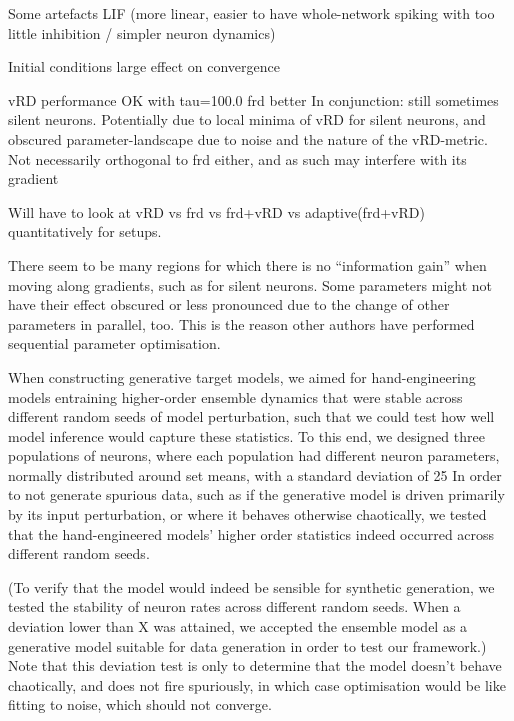 \documentclass[mphil,deptreport,ai]{infthesis} %
\begin{document}

Some artefacts LIF (more linear, easier to have whole-network spiking with too little inhibition / simpler neuron dynamics)

Initial conditions large effect on convergence

vRD performance OK with tau=100.0
frd better
In conjunction: still sometimes silent neurons. Potentially due to local minima of vRD for silent neurons, and obscured parameter-landscape due to noise and the nature of the vRD-metric. Not necessarily orthogonal to frd either, and as such may interfere with its gradient

Will have to look at vRD vs frd vs frd+vRD vs adaptive(frd+vRD) quantitatively for setups.

There seem to be many regions for which there is no “information gain” when moving along gradients, such as for silent neurons. Some parameters might not have their effect obscured or less pronounced due to the change of other parameters in parallel, too. This is the reason other authors have performed sequential parameter optimisation.

When constructing generative target models, we aimed for hand-engineering models entraining higher-order ensemble dynamics that were stable across different random seeds of model perturbation, such that we could test how well model inference would capture these statistics. To this end, we designed three populations of neurons, where each population had different neuron parameters, normally distributed around set means, with a standard deviation of 25 %
In order to not generate spurious data, such as if the generative model is driven primarily by its input perturbation, or where it behaves otherwise chaotically, we tested that the hand-engineered models’ higher order statistics indeed occurred across different random seeds.

(To verify that the model would indeed be sensible for synthetic generation, we tested the stability of neuron rates across different random seeds. When a deviation lower than X was attained, we accepted the ensemble model as a generative model suitable for data generation in order to test our framework.)
Note that this deviation test is only to determine that the model doesn’t behave chaotically, and does not fire spuriously, in which case optimisation would be like fitting to noise, which should not converge.
\end{document}
